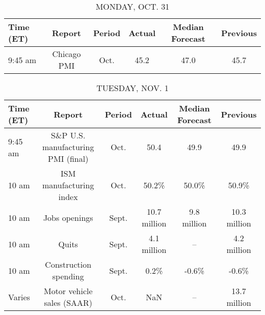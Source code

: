 \documentclass{article}%
\begin{document}
%
\normalsize%


\begin{table}[htbp]%
\caption{MONDAY, OCT. 31}%
\centering%
\begin{adjustbox}{width=1\textwidth}%
\begin{tabular}{lccccc}
\toprule
Time (ET) &      Report & Period & Actual & Median Forecast & Previous \\
\midrule
  9:45 am & Chicago PMI &   Oct. &   45.2 &            47.0 &     45.7 \\
\bottomrule
\end{tabular}
%
\end{adjustbox}%
\end{table}

%


\begin{table}[htbp]%
\caption{TUESDAY, NOV. 1}%
\centering%
\begin{adjustbox}{width=1\textwidth}%
\begin{tabular}{lccccc}
\toprule
Time (ET) &                             Report & Period &       Actual & Median Forecast &     Previous \\
\midrule
  9:45 am & S\&P U.S. manufacturing PMI (final) &   Oct. &         50.4 &            49.9 &         49.9 \\
    10 am &            ISM manufacturing index &   Oct. &        50.2\% &           50.0\% &        50.9\% \\
    10 am &                      Jobs openings &  Sept. & 10.7 million &     9.8 million & 10.3 million \\
    10 am &                              Quits &  Sept. &  4.1 million &              -- &  4.2 million \\
    10 am &              Construction spending &  Sept. &         0.2\% &           -0.6\% &        -0.6\% \\
   Varies &         Motor vehicle sales (SAAR) &   Oct. &          NaN &              -- & 13.7 million \\
\bottomrule
\end{tabular}
%
\end{adjustbox}%
\end{table}

%
\end{document}
